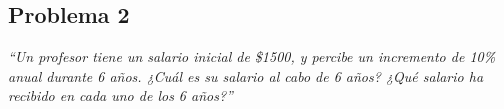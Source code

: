 \subsection{Problema 2}

\textit {“Un profesor tiene un salario inicial de \$1500, y percibe un incremento de 10\% anual durante 6 años. ¿Cuál es su salario al cabo de 6 años? ¿Qué salario ha recibido en cada uno de los 6 años?”}

